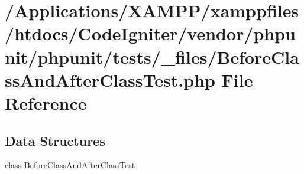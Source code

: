 \hypertarget{_before_class_and_after_class_test_8php}{}\section{/\+Applications/\+X\+A\+M\+P\+P/xamppfiles/htdocs/\+Code\+Igniter/vendor/phpunit/phpunit/tests/\+\_\+files/\+Before\+Class\+And\+After\+Class\+Test.php File Reference}
\label{_before_class_and_after_class_test_8php}
\subsection*{Data Structures}
\begin{DoxyCompactItemize}
\item 
class \mbox{\hyperlink{class_before_class_and_after_class_test}{Before\+Class\+And\+After\+Class\+Test}}
\end{DoxyCompactItemize}
